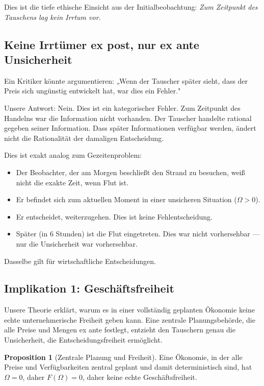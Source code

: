\documentclass[a4paper,12pt]{article}
\theoremstyle{definition}
\newtheorem{proposition}{Proposition}
\begin{document}
Dies ist die tiefe ethische Einsicht aus der Initialbeobachtung: \emph{Zum Zeitpunkt des Tauschens lag kein Irrtum vor.}

\subsection{Keine Irrtümer ex post, nur ex ante Unsicherheit}

Ein Kritiker könnte argumentieren: „Wenn der Tauscher später sieht, dass der Preis sich ungünstig entwickelt hat, war dies ein Fehler."

Unsere Antwort: Nein. Dies ist ein kategorischer Fehler. Zum Zeitpunkt des Handelns war die Information nicht vorhanden. Der Tauscher handelte rational gegeben seiner Information. Dass später Informationen verfügbar werden, ändert nicht die Rationalität der damaligen Entscheidung.

Dies ist exakt analog zum Gezeitenproblem:
\begin{itemize}
    \item Der Beobachter, der am Morgen beschließt den Strand zu besuchen, weiß nicht die exakte Zeit, wenn Flut ist.
    \item Er befindet sich zum aktuellen Moment in einer unsicheren Situation ($\Omega > 0$).
    \item Er entscheidet, weiterzugehen. Dies ist keine Fehlentscheidung.
    \item Später (in 6 Stunden) ist die Flut eingetreten. Dies war nicht vorhersehbar --- nur die Unsicherheit war vorhersehbar.
\end{itemize}

Dasselbe gilt für wirtschaftliche Entscheidungen.

\subsection{Implikation 1: Geschäftsfreiheit}

Unsere Theorie erklärt, warum es in einer vollständig geplanten Ökonomie keine echte unternehmerische Freiheit geben kann. Eine zentrale Planungsbehörde, die alle Preise und Mengen ex ante festlegt, entzieht den Tauschern genau die Unsicherheit, die Entscheidungsfreiheit ermöglicht.

\begin{proposition}[Zentrale Planung und Freiheit]
    Eine Ökonomie, in der alle Preise und Verfügbarkeiten zentral geplant und damit deterministisch sind, hat $\Omega = 0$, daher $F(\Omega) = 0$, daher keine echte Geschäftsfreiheit.
\end{proposition}
\end{document}
